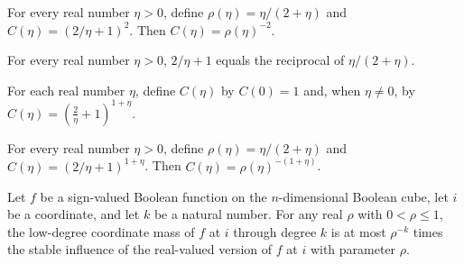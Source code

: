 \begin{theorem}
\label{FABL.improvedFriedgutConstant_eq_inv_rho_sq}
\leanok
{}
For every real number $\eta>0$, define $\rho(\eta)=\eta/(2+\eta)$ and
$C(\eta)=(2/\eta+1)^2$. Then $C(\eta)=\rho(\eta)^{-2}$.
\end{theorem}

\begin{theorem}
\label{FABL.two_div_eta_add_one_eq_inv_improvedFriedgutRho}
\leanok
{}
For every real number $\eta>0$, $2/\eta+1$ equals the reciprocal of $\eta/(2+\eta)$.
\end{theorem}

\begin{definition}
\label{FABL.improvedFriedgutGeneralConstant}
\leanok
For each real number $\eta$, define $C(\eta)$ by $C(0)=1$ and, when $\eta\ne 0$, by
$C(\eta)=\left(\frac{2}{\eta}+1\right)^{1+\eta}$.
\end{definition}

\begin{theorem}
\label{FABL.improvedFriedgutGeneralConstant_eq_inv_rho_rpow}
\leanok
{}
For every real number $\eta>0$, define $\rho(\eta)=\eta/(2+\eta)$ and
$C(\eta)=(2/\eta+1)^{1+\eta}$. Then $C(\eta)=\rho(\eta)^{-(1+\eta)}$.
\end{theorem}

\begin{theorem}
\label{FABL.lowDegreeCoordinateMass_le_inv_rho_pow_mul_stableInfluence}
\leanok
{}
Let $f$ be a sign-valued Boolean function on the $n$-dimensional Boolean cube, let $i$
be a coordinate, and let $k$ be a natural number. For any real $\rho$ with
$0<\rho\leq 1$, the low-degree coordinate mass of $f$ at $i$ through degree $k$ is at
most $\rho^{-k}$ times the stable influence of the real-valued version of $f$ at $i$
with parameter $\rho$.
\end{theorem}

